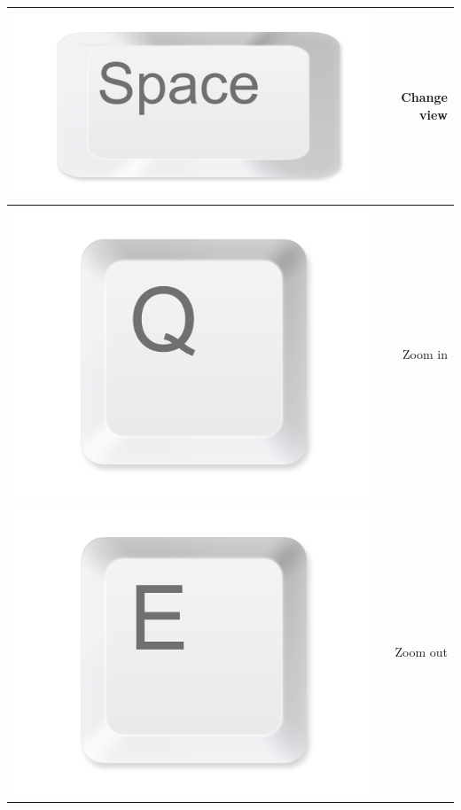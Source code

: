 \documentclass[11pt,a4paper]{report}
\begin{document}
\begin{table}[htbp]
\begin{tabular}{rr}
    \midrule
          \includegraphics[width=\buttonsize\textwidth]{ButtonSpace} & Change view \\
    \midrule
          \includegraphics[width=\buttonsize\textwidth]{ButtonQ} & Zoom in \\
    \midrule
          \includegraphics[width=\buttonsize\textwidth]{ButtonE} & Zoom out \\

\end{tabular}
\end{table}
\end{document}
